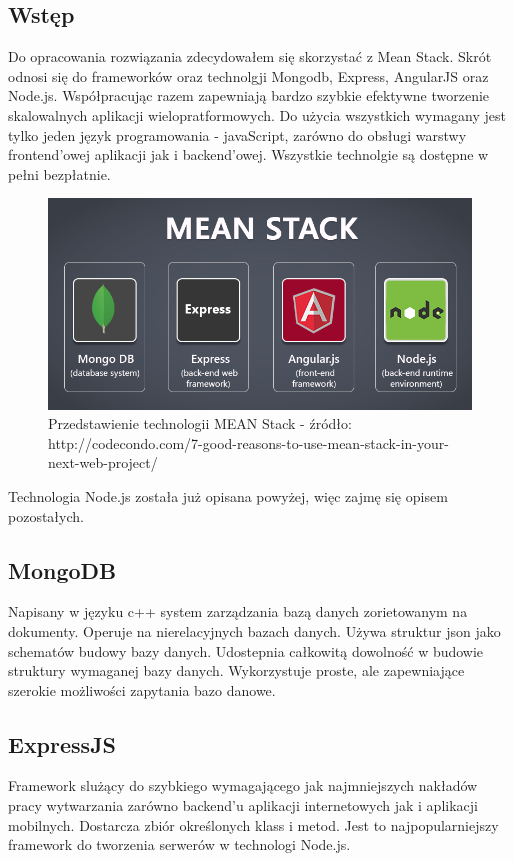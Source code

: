 \documentclass[12pt]{report}
\begin{document}
\subsection{Wstęp}
Do opracowania rozwiązania zdecydowałem się skorzystać z Mean Stack. 
Skrót odnosi się do frameworków oraz technolgji Mongodb, Express, AngularJS oraz Node.js. 
Współpracując razem zapewniają bardzo szybkie efektywne tworzenie skalowalnych aplikacji wielopratformowych. 
Do użycia wszystkich wymagany jest tylko jeden język programowania - javaScript, zarówno do obsługi warstwy frontend'owej aplikacji jak i backend'owej. 
Wszystkie technolgie są dostępne w pełni bezpłatnie. 
\begin{figure}[!hb]
\centering
\includegraphics[width=\textwidth,height=\textheight,keepaspectratio]{meanStack.png} 
\caption{Przedstawienie technologii MEAN Stack - źródło: http://codecondo.com/7-good-reasons-to-use-mean-stack-in-your-next-web-project/}
\end{figure}

Technologia Node.js została już opisana powyżej, więc zajmę się opisem pozostałych.

\subsection{MongoDB}
Napisany w języku c++ system zarządzania bazą danych zorietowanym na dokumenty. 
Operuje na nierelacyjnych bazach danych. 
Używa struktur json jako schematów budowy bazy danych.
Udostepnia całkowitą dowolność w budowie struktury wymaganej bazy danych. 
Wykorzystuje proste, ale zapewniające szerokie możliwości zapytania bazo danowe.

\subsection{ExpressJS }
Framework slużący do szybkiego wymagającego jak najmniejszych nakładów pracy wytwarzania zarówno backend’u aplikacji internetowych jak i aplikacji mobilnych.
Dostarcza zbiór określonych klass i metod. Jest to najpopularniejszy framework do tworzenia serwerów w technologi Node.js.
\end{document}
